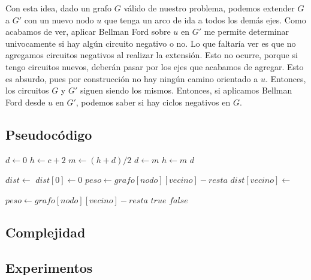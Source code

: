 Con esta idea, dado un grafo  $G$ válido de nuestro problema, podemos extender $G$ a $G'$ con un nuevo nodo $u$ que tenga un arco de ida a todos los demás ejes. Como acabamos de ver, aplicar Bellman Ford sobre $u$ en $G'$ me permite determinar univocamente si hay algún circuito negativo o no. Lo que faltaría ver es que no agregamos circuitos negativos al realizar la extensión. Esto no ocurre, porque si tengo circuitos nuevos, deberán pasar por los ejes que acabamos de agregar. Esto es absurdo, pues por construcción no hay ningún camino orientado a $u$. Entonces, los circuitos $G$ y $G'$ siguen siendo los mismos. Entonces, si aplicamos Bellman Ford desde $u$ en $G'$, podemos saber si hay ciclos negativos en $G$. \\



\newpage
\subsection{Pseudocódigo}

\begin{algorithm}
\label{resolver}         %
\begin{algorithmic}
    \State $d \gets 0$
	\State $h \gets c + 2$
		\State $m \gets (h + d)/2$
			\State $d \gets m$
		\Else
			\State $h \gets m$
		\EndIf
	\EndWhile
	\Return $d$
\EndFunction
\end{algorithmic}
\end{algorithm}
\begin{algorithm}
\begin{algorithmic}
	\State $dist \gets$ 
	\State $dist[0] \gets 0$
	\For{$i \in [1..n)$}
				\State $peso \gets grafo[nodo][vecino] - resta$
				\State $dist[vecino] \gets$ 
			\EndFor
		\EndFor
	\EndFor
	\Return {}
\EndFunction
\end{algorithmic}
\end{algorithm}
\begin{algorithm}
\begin{algorithmic}
			\State $peso \gets grafo[nodo][vecino] - resta$
				\Return $true$
			\EndIf
		\EndFor
	\EndFor
	\Return $false$
\EndFunction
\end{algorithmic}
\end{algorithm}
\newpage
\subsection{Complejidad}

\subsection{Experimentos}